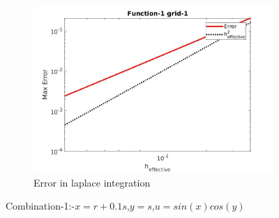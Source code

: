 \documentclass{article}
\begin{document}
\begin{figure}
    \bigskip
    \begin{subfigure}{\textwidth}
    \centering
    \includegraphics[scale=0.33]{error-inlaplace1.jpg}
    \caption{Error in laplace integration}
    \label{fig:doc3}
    \end{subfigure}
\caption{Combination-1:-$x = r + 0.1 s$,$y = s$,$u = sin(x)cos(y)$}
\end{figure}
\newpage 
\end{document}

